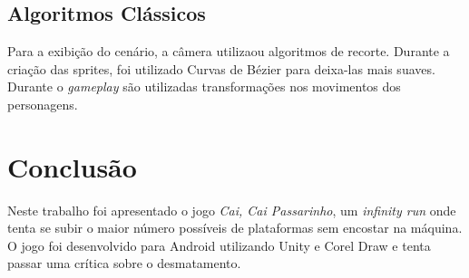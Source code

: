 \documentclass[12pt]{article}
\begin{document}
\subsection{Algoritmos Clássicos}
 	Para a exibição do cenário, a câmera utilizaou algoritmos de recorte. Durante a criação das sprites, foi utilizado Curvas de Bézier para deixa-las mais suaves. Durante o \textit{gameplay} são utilizadas transformações nos movimentos dos personagens.

\section{Conclusão}
	Neste trabalho foi apresentado o jogo \textit{Cai, Cai Passarinho}, um \textit{infinity run} onde tenta se subir o maior número possíveis de plataformas sem encostar na máquina. O jogo foi desenvolvido para Android utilizando Unity e Corel Draw e tenta passar uma crítica sobre o desmatamento.
\end{document}
